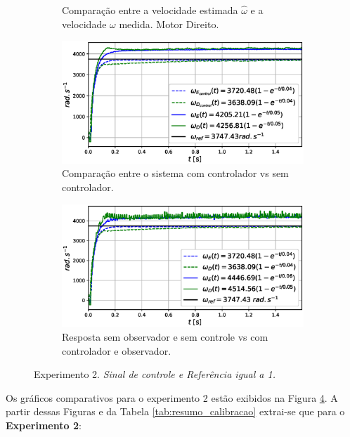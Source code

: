 \begin{figure}[H]
\begin{subfigure}{.5\textwidth}
    \caption{Comparação entre a velocidade estimada $\hat{\omega}$ e a velocidade $\omega$ medida. Motor Direito.}
    \label{fig:exp02:filtragem_direito}
    \end{subfigure}
    \hfill
    \begin{subfigure}{.5\textwidth}
    \centering
    \includegraphics[width=\textwidth]{figuras/resultados/exp02/controlador_vs_sem_controlador100.eps}
    \caption{Comparação entre o sistema com controlador vs sem controlador.}
    \label{fig:exp02:controle}
    \end{subfigure}
    \hfill
    \begin{subfigure}{.5\textwidth}
    \centering
    \includegraphics[width=\textwidth]{figuras/resultados/exp02/antes_vs_depois100.eps}
    \caption{Resposta sem observador e sem controle vs com controlador e observador.}
    \label{fig:exp02:antes_vs_depois}
    \end{subfigure}
    
    \caption{Experimento 2. \emph{Sinal de controle e Referência igual a 1.}}
    \label{fig:exp02_100}
\end{figure}

Os gráficos comparativos para o experimento 2 estão exibidos na Figura \ref{fig:exp02_100}. A partir dessas Figuras e da Tabela \ref{tab:resumo_calibracao} extrai-se que para o \textbf{Experimento 2}:


